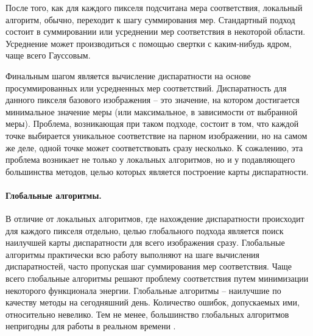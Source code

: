 \documentclass[oneside,final,12pt]{scrartcl}
\begin{document}
			После того, как для каждого пикселя подсчитана мера соответствия, локальный алгоритм, обычно, переходит к шагу суммирования мер. Стандартный подход состоит в суммировании или усреднении мер соответствия в некоторой области. Усреднение может производиться с помощью свертки с каким-нибудь ядром, чаще всего Гауссовым.

			Финальным шагом является вычисление диспаратности на основе просуммированных или усредненных мер соответствий. Диспаратность для данного пикселя базового изображения – это значение, на котором достигается минимальное значение меры (или максимальное, в зависимости от выбранной меры). Проблема, возникающая при таком подходе,	состоит в том, что каждой точке выбирается уникальное соответствие на парном изображении, но на самом же деле, одной точке может соответствовать сразу несколько. К сожалению, эта	проблема возникает не только у локальных алгоритмов, но и у подавляющего большинства	методов, целью которых является построение карты диспаратности.

			\paragraph{Глобальные алгоритмы.} В отличие от локальных алгоритмов, где нахождение диспаратности происходит для каждого	пикселя отдельно, целью глобального подхода является поиск наилучшей карты	диспаратности для всего изображения сразу. Глобальные алгоритмы практически всю работу	выполняют на шаге вычисления диспаратностей, часто пропуская шаг суммирования мер соответствия. Чаще всего глобальные алгоритмы решают проблему соответствия путем минимизации некоторого функционала энергии.
			Глобальные алгоритмы -- наилучшие по качеству методы на сегодняшний день. Количество ошибок, допускаемых ими, относительно невелико. Тем не менее, большинство глобальных алгоритмов непригодны для работы в реальном времени \cite{Scharstein2002}.
\end{document}
